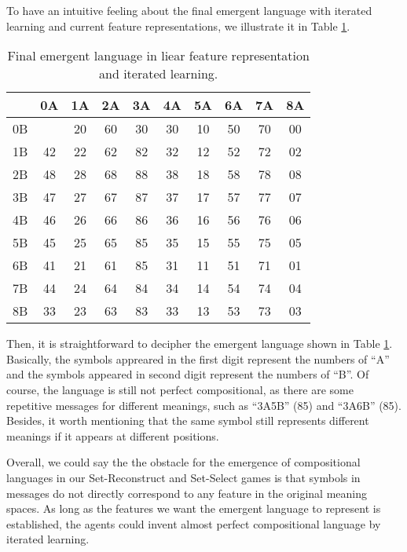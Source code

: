 To have an intuitive feeling about the final emergent language with iterated learning and current feature representations, we illustrate it in Table \ref{tab4.6:emregent_language_referential_perfect}. 

\begin{table}[!h]
    \centering
    \begin{tabular}{|c|c|c|c|c|c|c|c|c|c|}
        \hline
           & 0A & 1A & 2A & 3A & 4A & 5A & 6A & 7A & 8A \\ \hline
        0B &    & 20 & 60 & 30 & 30 & 10 & 50 & 70 & 00 \\ \hline
        1B & 42 & 22 & 62 & 82 & 32 & 12 & 52 & 72 & 02 \\ \hline
        2B & 48 & 28 & 68 & 88 & 38 & 18 & 58 & 78 & 08 \\ \hline
        3B & 47 & 27 & 67 & 87 & 37 & 17 & 57 & 77 & 07 \\ \hline
        4B & 46 & 26 & 66 & 86 & 36 & 16 & 56 & 76 & 06 \\ \hline
        5B & 45 & 25 & 65 & 85 & 35 & 15 & 55 & 75 & 05 \\ \hline
        6B & 41 & 21 & 61 & 85 & 31 & 11 & 51 & 71 & 01 \\ \hline
        7B & 44 & 24 & 64 & 84 & 34 & 14 & 54 & 74 & 04 \\ \hline
        8B & 33 & 23 & 63 & 83 & 33 & 13 & 53 & 73 & 03 \\ \hline
        \end{tabular}
    \caption{Final emergent language in liear feature representation and iterated learning.}
    \label{tab4.6:emregent_language_referential_perfect}
\end{table}

Then, it is straightforward to decipher the emergent language shown in Table \ref{tab4.6:emregent_language_referential_perfect}. Basically, the symbols appreared in the first digit represent the numbers of ``A'' and the symbols appeared in second digit represent the numbers of ``B''. Of course, the language is still not perfect compositional, as there are some repetitive messages for different meanings, such as ``3A5B'' (85) and ``3A6B'' (85). Besides, it worth mentioning that the same symbol still represents different meanings if it appears at different positions.

Overall, we could say the the obstacle for the emergence of compositional languages in our Set-Reconstruct and Set-Select games is that symbols in messages do not directly correspond to any feature in the original meaning spaces. As long as the features we want the emergent language to represent is established, the agents could invent almost perfect compositional language by iterated learning.

